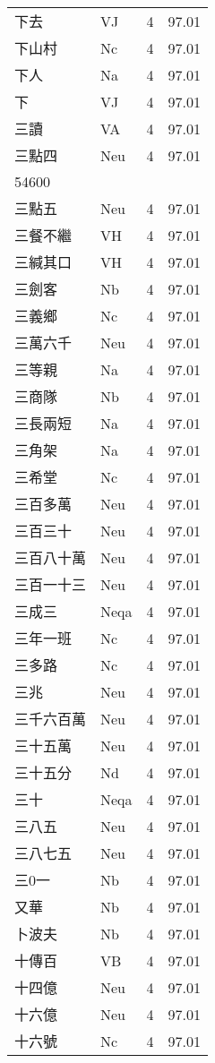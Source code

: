 \documentclass[twocolumn]{book}
\begin{document}
\begin{supertabular}{llrr}
下去 & VJ & 4 &  97.01\\
下山村 & Nc & 4 &  97.01\\
下人 & Na & 4 &  97.01\\
下 & VJ & 4 &  97.01\\
三讀 & VA & 4 &  97.01\\
三點四 & Neu & 4 &  97.01\\
54600\\
三點五 & Neu & 4 &  97.01\\
三餐不繼 & VH & 4 &  97.01\\
三緘其口 & VH & 4 &  97.01\\
三劍客 & Nb & 4 &  97.01\\
三義鄉 & Nc & 4 &  97.01\\
三萬六千 & Neu & 4 &  97.01\\
三等親 & Na & 4 &  97.01\\
三商隊 & Nb & 4 &  97.01\\
三長兩短 & Na & 4 &  97.01\\
三角架 & Na & 4 &  97.01\\
三希堂 & Nc & 4 &  97.01\\
三百多萬 & Neu & 4 &  97.01\\
三百三十 & Neu & 4 &  97.01\\
三百八十萬 & Neu & 4 &  97.01\\
三百一十三 & Neu & 4 &  97.01\\
三成三 & Neqa & 4 &  97.01\\
三年一班 & Nc & 4 &  97.01\\
三多路 & Nc & 4 &  97.01\\
三兆 & Neu & 4 &  97.01\\
三千六百萬 & Neu & 4 &  97.01\\
三十五萬 & Neu & 4 &  97.01\\
三十五分 & Nd & 4 &  97.01\\
三十 & Neqa & 4 &  97.01\\
三八五 & Neu & 4 &  97.01\\
三八七五 & Neu & 4 &  97.01\\
三0一 & Nb & 4 &  97.01\\
又華 & Nb & 4 &  97.01\\
卜波夫 & Nb & 4 &  97.01\\
十傳百 & VB & 4 &  97.01\\
十四億 & Neu & 4 &  97.01\\
十六億 & Neu & 4 &  97.01\\
十六號 & Nc & 4 &  97.01\\

\end{supertabular}
\end{document}
